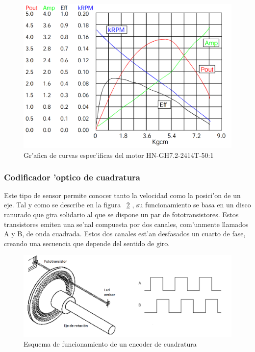 \documentclass[twoside,12pt]{article}
\begin{document}
\begin{figure}[ht]
\centering
\includegraphics[scale=0.35]{images/motor_graph.png} 
\caption{Gr'afica de curvas espec'ificas del motor HN-GH7.2-2414T-50:1}
\label{fig:Gr'afica del Motor}
\end{figure}

\subsubsection{Codificador 'optico de cuadratura}
Este tipo de sensor permite conocer tanto la velocidad como la posici'on de un eje. Tal y como se describe en la figura ~\ref{fig:Esquema QEI} , su funcionamiento se basa en un disco ranurado que gira solidario al que se dispone un par de fototransistores. Estos transistores emiten una se'nal compuesta por dos canales, com'unmente llamados A y B, de onda cuadrada. Estos dos canales est'an desfasados un cuarto de fase, creando una secuencia que depende del sentido de giro. 

\begin{figure}[ht]
\centering
\includegraphics[scale=0.45]{images/encoderQEI.png} 
\caption{Esquema de funcionamiento de un encoder de cuadratura}
\label{fig:Esquema QEI}
\end{figure}
\end{document}
